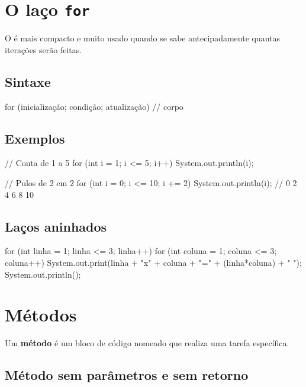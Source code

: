 \documentclass[11pt,a4paper]{article}
\begin{document}
\section{O laço \texttt{for}}

O  é mais compacto e muito usado quando se sabe antecipadamente quantas iterações serão feitas.

\subsection{Sintaxe}

\begin{javacode}
for (inicialização; condição; atualização) {
    // corpo
}
\end{javacode}

\subsection{Exemplos}

\begin{javacode}
// Conta de 1 a 5
for (int i = 1; i <= 5; i++) {
    System.out.println(i);
}

// Pulos de 2 em 2
for (int i = 0; i <= 10; i += 2) {
    System.out.println(i); // 0 2 4 6 8 10
}
\end{javacode}

\subsection{Laços aninhados}

\begin{javacode}
for (int linha = 1; linha <= 3; linha++) {
    for (int coluna = 1; coluna <= 3; coluna++) {
        System.out.print(linha + "x" + coluna + "=" + (linha*coluna) + "  ");
    }
    System.out.println();
}
\end{javacode}

\section{Métodos}

Um \textbf{método} é um bloco de código nomeado que realiza uma tarefa específica.

\subsection{Método sem parâmetros e sem retorno}
\end{document}
